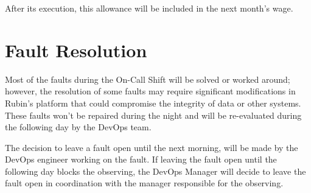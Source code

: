 After its execution, this allowance will be included in the next month's wage.


\section{Fault Resolution}

Most of the faults during the On-Call Shift will be solved or worked around; however, the resolution of some faults may require significant modifications in Rubin’s platform that could compromise the integrity of data or other systems. These faults won’t be repaired during the night and will be re-evaluated during the following day by the DevOps team.

The decision to leave a fault open until the next morning, will be made by the DevOps engineer working on the fault. If leaving the fault open until the following day blocks the observing, the DevOps Manager will decide to leave the fault open in coordination with the manager responsible for the observing.  
